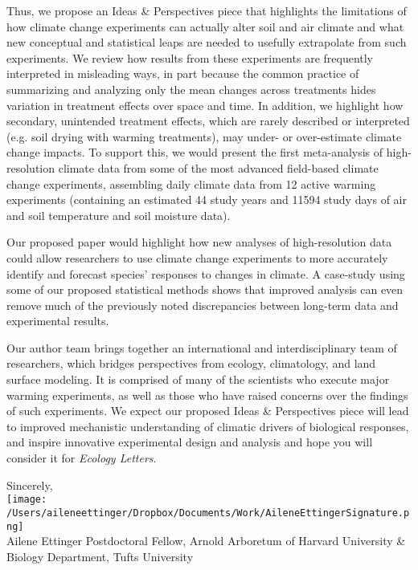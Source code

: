 \documentclass[11pt,a4paper]{letter}
\begin{document}
\begin{letter}{}
Thus, we propose an Ideas \& Perspectives piece that highlights the limitations of how climate change experiments can actually alter soil and air climate and what new conceptual and statistical leaps are needed to usefully extrapolate from such experiments. We review how results from these experiments are frequently interpreted in misleading ways, in part because the common practice of summarizing and analyzing only the mean changes across treatments hides variation in treatment effects over space and time. In addition, we highlight how secondary, unintended treatment effects, which are rarely described or interpreted (e.g. soil drying with warming treatments), may under- or over-estimate climate change impacts. To support this, we would present the first meta-analysis of high-resolution climate data from some of the most advanced field-based climate change experiments, assembling daily climate data from 12 active warming experiments (containing an estimated 44 study years and 11594 study days of air and soil temperature and soil moisture data). %

Our proposed paper would highlight how new analyses of high-resolution data could allow researchers to use climate change experiments to more accurately identify and forecast species' responses to changes in climate. A case-study using some of our proposed statistical methods shows that improved analysis can even remove much of the previously noted discrepancies between long-term data and experimental results. 

Our author team brings together an international and interdisciplinary team of researchers, which bridges perspectives from ecology, climatology, and land surface modeling. It is comprised of many of the scientists who execute major warming experiments, as well as those who have raised concerns over the findings of such experiments.  We expect our proposed Ideas \& Perspectives piece will lead to improved mechanistic understanding of climatic drivers of biological responses, and inspire innovative experimental design and analysis and hope you will consider it for \emph{Ecology Letters}.

Sincerely,\\

\texttt{[image: /Users/aileneettinger/Dropbox/Documents/Work/AileneEttingerSignature.png]} \\
Ailene Ettinger
Postdoctoral Fellow, Arnold Arboretum of Harvard University \& Biology Department, Tufts University


\end{letter}
\end{document}
